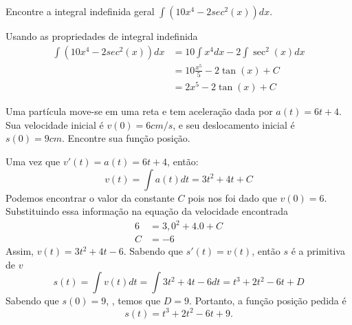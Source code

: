 \begin{example}
  Encontre a integral indefinida geral $\int (10x^4-2sec^2(x))dx$.

  \solution
  Usando as propriedades de integral indefinida
  \begin{align*}
    \int (10x^4-2sec^2(x))dx
    & = 10 \int x^4 dx - 2 \int \sec^2(x)dx \\
    & = 10 \frac{x^5}{5}-2\tan(x)+C \\
    & = 2x^5-2\tan(x)+C
  \end{align*}
\end{example}

\begin{example}
  Uma partícula move-se em uma reta e tem aceleração dada por $a(t)=6t+4$. Sua
  velocidade inicial é $v(0)=6 cm/s$, e seu deslocamento inicial é $s(0)=9cm$.
  Encontre sua função posição.

  \solution
  Uma vez que $v'(t)=a(t)=6t+4$, então:
  \[
  v(t)= \int a(t) dt= 3t^2+4t+C
  \]
  Podemos encontrar o valor da constante $C$ pois nos foi dado que $v(0)=6$.
  Substituindo essa informação na equação da velocidade encontrada
  \begin{align*}
    6 & = 3,0^2 + 4.0 + C \\
    C & =-6
  \end{align*}
  Assim, $v(t)=3t^2+4t-6$. Sabendo que $s'(t)=v(t)$, então $s$
  é a primitiva de $v$
  \[
  s(t)=\int v(t) dt
  = \int 3t^2+4t-6 dt
  = t^3+2t^2-6t+D
  \]
  Sabendo que $s(0)=9$, , temos que $D=9$. Portanto, a função posição pedida é
  \[
  s(t) = t^3+2t^2-6t+9.
  \]
\end{example}


